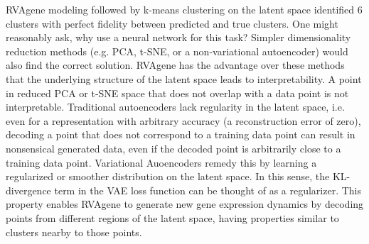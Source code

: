 RVAgene modeling followed by k-means clustering on the latent space identified 6 clusters with perfect fidelity between predicted and true clusters. One might reasonably ask, why use a neural network for this task? Simpler dimensionality reduction methods (e.g. PCA, t-SNE, or a non-variational autoencoder) would also find the correct solution. RVAgene has the advantage over these methods that the underlying structure of the latent space leads to interpretability. A point in reduced PCA or t-SNE space that does not overlap with a data point is not interpretable. Traditional autoencoders lack regularity in the latent space, i.e. even for a representation with arbitrary accuracy (a reconstruction error of zero), decoding a point that does not correspond to a training data point can result in nonsensical generated data, even if the decoded point is arbitrarily close to a training data point. Variational Auoencoders remedy this by learning a regularized or smoother distribution on the latent space. In this sense, the KL-divergence term in the VAE loss function can be thought of as a regularizer. This property enables RVAgene to generate new gene expression dynamics by decoding points from different regions of the latent space, having properties similar to clusters nearby to those points.


